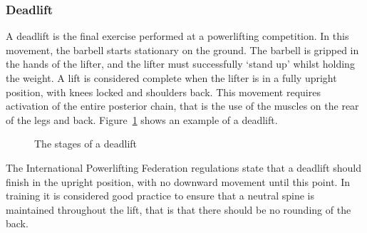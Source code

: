 \subsubsection{Deadlift}

A deadlift is the final exercise performed at a powerlifting competition. In this movement, the barbell starts stationary on the ground. The barbell is gripped in the hands of the lifter, and the lifter must successfully ‘stand up’ whilst holding the weight. A lift is considered complete when the lifter is in a fully upright position, with knees locked and shoulders back. This movement requires activation of the entire posterior chain, that is the use of the muscles on the rear of the legs and back. Figure~\ref{fig:dead_stages} shows an example of a deadlift.

\begin{figure}[H]
    \centering
\caption{The stages of a deadlift}
\label{fig:dead_stages}
\end{figure}

The International Powerlifting Federation regulations\cite{ipf} state that a deadlift should finish in the upright position, with no downward movement until this point. In training it is considered good practice to ensure that a neutral spine is maintained throughout the lift, that is that there should be no rounding of the back.
